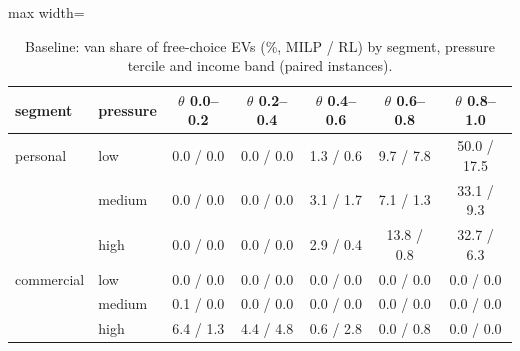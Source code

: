 \begin{table}[H]\centering
\scriptsize
\caption{Baseline: van share of free-choice EVs (\%, MILP / RL) by segment, pressure tercile and income band (paired instances).}\label{tab:pressband}
\begin{adjustbox}{max width=\textwidth}\begin{tabular}{llccccc}\toprule
segment & pressure & $\theta$ 0.0--0.2 & $\theta$ 0.2--0.4 & $\theta$ 0.4--0.6 & $\theta$ 0.6--0.8 & $\theta$ 0.8--1.0 \\ \midrule
personal & low & 0.0 / 0.0 & 0.0 / 0.0 & 1.3 / 0.6 & 9.7 / 7.8 & 50.0 / 17.5 \\
 & medium & 0.0 / 0.0 & 0.0 / 0.0 & 3.1 / 1.7 & 7.1 / 1.3 & 33.1 / 9.3 \\
 & high & 0.0 / 0.0 & 0.0 / 0.0 & 2.9 / 0.4 & 13.8 / 0.8 & 32.7 / 6.3 \\
commercial & low & 0.0 / 0.0 & 0.0 / 0.0 & 0.0 / 0.0 & 0.0 / 0.0 & 0.0 / 0.0 \\
 & medium & 0.1 / 0.0 & 0.0 / 0.0 & 0.0 / 0.0 & 0.0 / 0.0 & 0.0 / 0.0 \\
 & high & 6.4 / 1.3 & 4.4 / 4.8 & 0.6 / 2.8 & 0.0 / 0.8 & 0.0 / 0.0 \\
\bottomrule\end{tabular}\end{adjustbox}\end{table}
